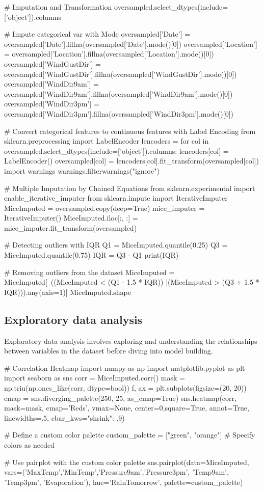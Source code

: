 \documentclass{josis}
\begin{document}
\begin{python}
# Imputation and Transformation
oversampled.select_dtypes(include=['object']).columns

# Impute categorical var with Mode
oversampled['Date'] = oversampled['Date'].fillna(oversampled['Date'].mode()[0])
oversampled['Location'] = oversampled['Location'].fillna(oversampled['Location'].mode()[0])
oversampled['WindGustDir'] = oversampled['WindGustDir'].fillna(oversampled['WindGustDir'].mode()[0])
oversampled['WindDir9am'] = oversampled['WindDir9am'].fillna(oversampled['WindDir9am'].mode()[0])
oversampled['WindDir3pm'] = oversampled['WindDir3pm'].fillna(oversampled['WindDir3pm'].mode()[0])

# Convert categorical features to continuous features with Label Encoding
from sklearn.preprocessing import LabelEncoder
lencoders = {}
for col in oversampled.select_dtypes(include=['object']).columns:
    lencoders[col] = LabelEncoder()
    oversampled[col] = lencoders[col].fit_transform(oversampled[col])
import warnings
warnings.filterwarnings("ignore")

# Multiple Imputation by Chained Equations
from sklearn.experimental import enable_iterative_imputer
from sklearn.impute import IterativeImputer
MiceImputed = oversampled.copy(deep=True)
mice_imputer = IterativeImputer()
MiceImputed.iloc[:, :] = mice_imputer.fit_transform(oversampled)
\end{python}

\begin{python}
# Detecting outliers with IQR
Q1 = MiceImputed.quantile(0.25)
Q3 = MiceImputed.quantile(0.75)
IQR = Q3 - Q1
print(IQR)

# Removing outliers from the dataset
MiceImputed = MiceImputed[~((MiceImputed < (Q1 - 1.5 * IQR)) |(MiceImputed > (Q3 + 1.5 * IQR))).any(axis=1)]
MiceImputed.shape
\end{python}
\subsection{Exploratory data analysis}
Exploratory data analysis involves exploring and understanding the relationships between variables in the dataset before diving into model building.
\begin{python}
# Correlation Heatmap
import numpy as np
import matplotlib.pyplot as plt
import seaborn as sns
corr = MiceImputed.corr()
mask = np.triu(np.ones_like(corr, dtype=bool))
f, ax = plt.subplots(figsize=(20, 20))
cmap = sns.diverging_palette(250, 25, as_cmap=True)
sns.heatmap(corr, mask=mask, cmap='Reds', vmax=None, center=0,square=True, annot=True, linewidths=.5, cbar_kws={"shrink": .9})

# Define a custom color palette
custom_palette = ["green", "orange"]  # Specify colors as needed

# Use pairplot with the custom color palette
sns.pairplot(data=MiceImputed, vars=('MaxTemp','MinTemp','Pressure9am','Pressure3pm', 'Temp9am', 'Temp3pm', 'Evaporation'), hue='RainTomorrow', palette=custom_palette)
\end{python}
\end{document}
